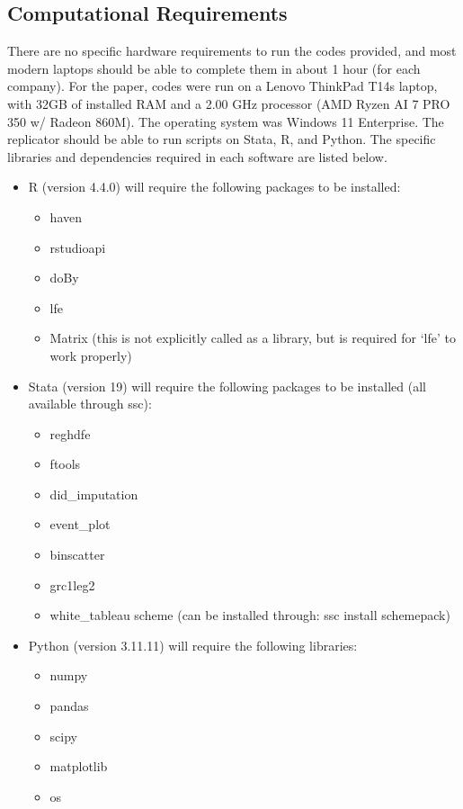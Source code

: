 \documentclass[
]{article}
\begin{document}
\subsection{Computational Requirements}

There are no specific hardware requirements to run the codes provided, and most modern laptops should be able to complete them in about 1 hour (for each company). For the paper, codes were run on a Lenovo ThinkPad T14s laptop, with 32GB of installed RAM and a 2.00 GHz processor (AMD Ryzen AI 7 PRO 350 w/ Radeon 860M). The operating system was Windows 11 Enterprise. The replicator should be able to run scripts on Stata, R, and Python. The specific libraries and dependencies required in each software are listed below.

\begin{itemize}
    \item R (version 4.4.0) will require the following packages to be installed:
        \begin{itemize}
            \item haven
            \item rstudioapi
            \item doBy
            \item lfe
            \item Matrix (this is not explicitly called as a library, but is required for `lfe' to work properly)
        \end{itemize}
    \item Stata (version 19) will require the following packages to be installed (all available through ssc):
        \begin{itemize}
            \item reghdfe
            \item ftools
            \item did\_imputation
            \item event\_plot
            \item binscatter
            \item grc1leg2
            \item white\_tableau scheme (can be installed through: ssc install schemepack)
        \end{itemize}
    \item Python (version 3.11.11) will require the following libraries:
        \begin{itemize}
            \item numpy
            \item pandas
            \item scipy
            \item matplotlib
            \item os
        \end{itemize}
\end{itemize}
\end{document}
